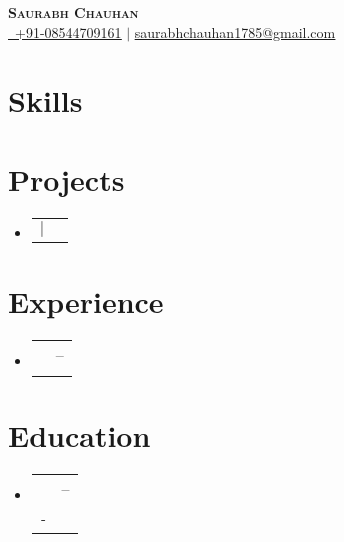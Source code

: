 \documentclass[letterpaper,11pt]{article}
\makeatletter
\newcommand{\resumeSubheading}[4]{
  \vspace{-2pt}\item
    \begin{tabular*}{0.97\textwidth}{l@{\extracolsep{\fill}}r}
      \textbf{#1} & #2 \\
      \textit{#3} & \textit{#4} \\
    \end{tabular*}\vspace{-7pt}
}
\newcommand{\resumeProjectHeading}[2]{
  \item
    \begin{tabular*}{0.97\textwidth}{l@{\extracolsep{\fill}}r}
      {#1} & #2 \\
    \end{tabular*}\vspace{-7pt}
}
\newcommand{\resumeSubHeadingListStart}{\begin{itemize}[leftmargin=0.15in, label={}]}
\newcommand{\resumeSubHeadingListEnd}{\end{itemize}}
\makeatother
\begin{document}
\begin{center}
  \textbf{\Huge \scshape Saurabh Chauhan} \\ \vspace{3pt}
  \small\href{tel:+9108544709161}{\raisebox{-0.2\height} {\faPhone}\ \underline{+91-08544709161}}
   $|$ \href{mailto:saurabhchauhan1785@gmail.com}{\raisebox{-0.2\height}\faEnvelope\underline {saurabhchauhan1785@gmail.com}}
  
  
\end{center}

\section{Skills}
\begin{itemize}[leftmargin=0.15in, label={}]
  
  
  
  
  
\end{itemize}

\section{Projects}
\resumeSubHeadingListStart

  \resumeProjectHeading
    {\textbf{}  $|$ \emph{}}{}
    

\resumeSubHeadingListEnd

\section{Experience}
\resumeSubHeadingListStart

  \resumeSubheading
    {}{--}
    {}{}
    

\resumeSubHeadingListEnd

\section{Education}
\resumeSubHeadingListStart

  \resumeSubheading
    {}{--}
    {-}{}

\resumeSubHeadingListEnd
\end{document}
